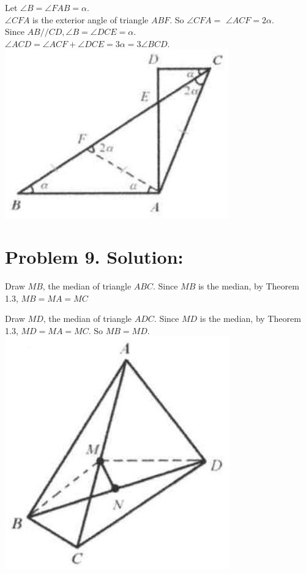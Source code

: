 \documentclass[10pt]{article}
\begin{document}
Let \(\angle B=\angle F A B=\alpha\).\\
\(\angle C F A\) is the exterior angle of triangle \(A B F\). So \(\angle C F A=\) \(\angle A C F=2 \alpha\).\\
Since \(A B / / C D, \angle B=\angle D C E=\alpha\).\\
\(\angle A C D=\angle A C F+\angle D C E=3 \alpha=3 \angle B C D\).\\
\includegraphics[max width=\textwidth, center]{2025_04_17_97bc1f7e44d93c271a88g-020(2)}

\section*{Problem 9. Solution:}
Draw \(M B\), the median of triangle \(A B C\). Since \(M B\) is the median, by Theorem 1.3, \(M B=M A=M C\)

Draw \(M D\), the median of triangle \(A D C\). Since \(M D\) is the median, by Theorem 1.3, \(M D=M A=M C\). So \(M B=M D\).\\
\includegraphics[max width=\textwidth, center]{2025_04_17_97bc1f7e44d93c271a88g-020(1)}
\end{document}
